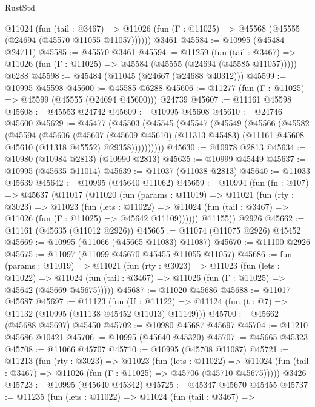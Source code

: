 \begin{lexlean}{RustStd}
\begin{coremodule}
    @11024
      (fun (tail : @3467) =>
      @11026 (fun (Γ : @11025) => @45568 (@45555 (@24694 (@45570 @11055 @11057))))))
    @3461
@45584 := @10995 (@45484 @24711)
@45585 := @45570 @3461
@45594 := @11259
    (fun (tail : @3467) => @11026 (fun (Γ : @11025) => @45584 (@45555 (@24694 (@45585 @11057)))))
    @6288
@45598 := @45484 (@11045 (@24667 (@24688 @40312)))
@45599 := @10995 @45598
@45600 := @45585 @6288
@45606 := @11277 (fun (Γ : @11025) => @45599 (@45555 (@24694 @45600))) @24739
@45607 := @11161 @45598
@45608 := @45553 @24742
@45609 := @10995 @45608
@45610 := @24746 @45600
@45629 := @45477
    (@45503
      (@45545
        (@45547
          (@45549
            (@45566
              (@45582
                (@45594
                  (@45606
                    (@45607
                      (@45609 @45610)
                      (@11313 @45483)
                      (@11161 @45608 @45610 (@11318 @45552) @29358))))))))))
@45630 := @10978 @2813
@45634 := @10980 (@10984 @2813) (@10990 @2813)
@45635 := @10999 @45449
@45637 := @10995 (@45635 @11014)
@45639 := @11037 (@11038 @2813)
@45640 := @11033 @45639
@45642 := @10995 (@45640 @11062)
@45659 := @10994
    (fun (fn : @107) =>
    @45637
      (@11017
        (@11020
          (fun (params : @11019) =>
          @11021
            (fun (rty : @3023) =>
            @11023
              (fun (lets : @11022) =>
              @11024 (fun (tail : @3467) => @11026 (fun (Γ : @11025) => @45642 @11109))))))
        @11155))
    @2926
@45662 := @11161 (@45635 (@11012 @2926))
@45665 := @11074 (@11075 @2926) @45452
@45669 := @10995 (@11066 (@45665 @11083) @11087)
@45670 := @11100 @2926
@45675 := @11097 (@11099 @45670 @45455 @11055 @11057)
@45686 := fun (params : @11019) =>
  @11021
    (fun (rty : @3023) =>
    @11023
      (fun (lets : @11022) =>
      @11024 (fun (tail : @3467) => @11026 (fun (Γ : @11025) => @45642 (@45669 @45675)))))
@45687 := @11020 @45686
@45688 := @11017 @45687
@45697 := @11123
    (fun (U : @11122) => @11124 (fun (t : @7) => @11132 (@10995 (@11138 @45452 @11013) @11149)))
@45700 := @45662 (@45688 @45697) @45450
@45702 := @10980 @45687 @45697
@45704 := @11210 @45686 @10421
@45706 := @10995 (@45640 @45320)
@45707 := @45665 @45323
@45708 := @11066 @45707
@45710 := @10995 (@45708 @11087)
@45721 := @11213
    (fun (rty : @3023) =>
    @11023
      (fun (lets : @11022) =>
      @11024 (fun (tail : @3467) => @11026 (fun (Γ : @11025) => @45706 (@45710 @45675)))))
    @3426
@45723 := @10995 (@45640 @45342)
@45725 := @45347 @45670 @45455
@45737 := @11235
    (fun (lets : @11022) =>
    @11024
      (fun (tail : @3467) =>

\end{coremodule}
\end{lexlean}
